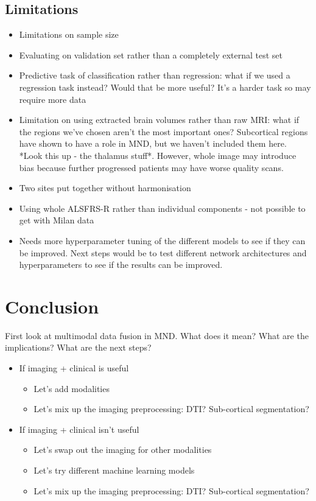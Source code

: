 \subsection{Limitations}
\begin{itemize}
    \item Limitations on sample size
    \item Evaluating on validation set rather than a completely external test set
    \item Predictive task of classification rather than regression: what if we used a regression task instead? Would that be more useful? It's a harder task so may require more data
    \item Limitation on using extracted brain volumes rather than raw MRI: what if the regions we've chosen aren't the most important ones? Subcortical regions have shown to have a role in MND, but we haven't included them here. *Look this up - the thalamus stuff*. However, whole image may introduce bias because further progressed patients may have worse quality scans.
    \item Two sites put together without harmonisation
    \item Using whole ALSFRS-R rather than individual components - not possible to get with Milan data
    \item Needs more hyperparameter tuning of the different models to see if they can be improved. Next steps would be to test different network architectures and hyperparameters to see if the results can be improved.
\end{itemize}

\section{Conclusion}
First look at multimodal data fusion in MND. What does it mean? What are the implications? What are the next steps?
\begin{itemize}
    \item If imaging + clinical is useful
    \begin{itemize}
        \item Let's add modalities
        \item Let's mix up the imaging preprocessing: DTI? Sub-cortical segmentation?
    \end{itemize}
    \item If imaging + clinical isn't useful
    \begin{itemize}
        \item Let's swap out the imaging for other modalities
        \item Let's try different machine learning models
        \item Let's mix up the imaging preprocessing: DTI? Sub-cortical segmentation?
    \end{itemize}
\end{itemize}
